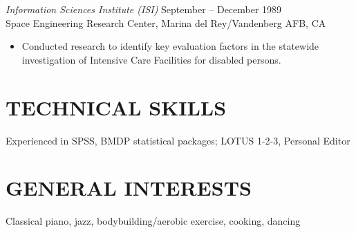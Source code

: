 \documentclass[10pt]{res} %
\begin{document}
\begin{resume}
{\sl Information Sciences Institute (ISI)} \hfill September -- December 1989 \\
Space Engineering Research Center, Marina del Rey/Vandenberg AFB, CA 
\begin{itemize}
\item Conducted research to identify key evaluation factors in the statewide investigation of Intensive Care Facilities for disabled persons.
\end{itemize}
\section{TECHNICAL SKILLS}

Experienced in SPSS, BMDP statistical packages; LOTUS 1-2-3, Personal Editor 

\section{GENERAL INTERESTS}

\vspace{-5pt} %

\begin{center}
Classical piano, jazz, bodybuilding/aerobic exercise, cooking, dancing
\end{center} 


\end{resume} 
\end{document}
